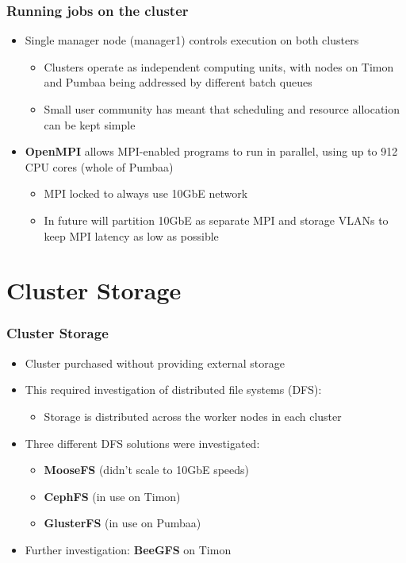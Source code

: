 \documentclass[handout]{beamer}
\begin{document}
\begin{frame}
\frametitle{Running jobs on the cluster}
\begin{itemize}
\item Single manager node (manager1) controls execution on both clusters
\begin{itemize}
\item Clusters operate as independent computing units, with nodes on Timon and Pumbaa being addressed by different batch queues
\item Small user community has meant that scheduling and resource allocation can be kept simple
\end{itemize}
\item \textbf{OpenMPI} allows MPI-enabled programs to run in parallel, using up to 912 CPU cores (whole of Pumbaa)
\begin{itemize}
\item MPI locked to always use 10GbE network
\item In future will partition 10GbE as separate MPI and storage VLANs to keep MPI latency as low as possible
\end{itemize}
\end{itemize}
\end{frame}

\section{Cluster Storage}

\begin{frame}
\frametitle{Cluster Storage}
\begin{itemize}
\item Cluster purchased without providing external storage
\item This required investigation of distributed file systems (DFS):
\begin{itemize}
\item Storage is distributed across the worker nodes in each cluster
\end{itemize}
\item Three different DFS solutions were investigated:
\begin{itemize}
\item \textbf{MooseFS} (didn't scale to 10GbE speeds)
\item \textbf{CephFS} (in use on Timon)
\item \textbf{GlusterFS} (in use on Pumbaa)
\end{itemize}
\item Further investigation: \textbf{BeeGFS} on Timon
\end{itemize}
\end{frame}
\end{document}
